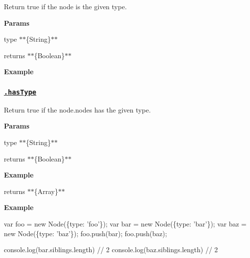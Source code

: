 Return true if the node is the given {\ttfamily type}.

{\bfseries Params}


\begin{DoxyItemize}
\item {\ttfamily type} $\ast$$\ast$\{String\}$\ast$$\ast$
\item {\ttfamily returns} $\ast$$\ast$\{Boolean\}$\ast$$\ast$
\end{DoxyItemize}

{\bfseries Example}




\subsubsection*{\href{index.js#L270}{\tt .has\+Type}}

Return true if the {\ttfamily node.\+nodes} has the given {\ttfamily type}.

{\bfseries Params}


\begin{DoxyItemize}
\item {\ttfamily type} $\ast$$\ast$\{String\}$\ast$$\ast$
\item {\ttfamily returns} $\ast$$\ast$\{Boolean\}$\ast$$\ast$
\end{DoxyItemize}

{\bfseries Example}





\begin{DoxyItemize}
\item {\ttfamily returns} $\ast$$\ast$\{Array\}$\ast$$\ast$
\end{DoxyItemize}

{\bfseries Example}


\begin{DoxyCode}
var foo = new Node(\{type: 'foo'\});
var bar = new Node(\{type: 'bar'\});
var baz = new Node(\{type: 'baz'\});
foo.push(bar);
foo.push(baz);

console.log(bar.siblings.length) // 2
console.log(baz.siblings.length) // 2
\end{DoxyCode}



